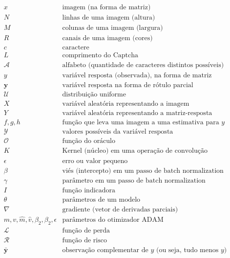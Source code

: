 \documentclass[12pt,twoside,brazilian]{book}
\begin{document}
\begin{displaymath}
\begin{array}{ll}
   x & \text{imagem (na forma de matriz)}\\
   N & \text{linhas de uma imagem (altura)}\\
   M & \text{colunas de uma imagem (largura)}\\
   R & \text{canais de uma imagem (cores)}\\
   c & \text{caractere}\\
   L & \text{comprimento do Captcha}\\
   \mathcal A & \text{alfabeto (quantidade de caracteres distintos possíveis)}\\
   y & \text{variável resposta (observada), na forma de matriz}\\
   \mathbf y & \text{variável resposta na forma de rótulo parcial}\\
   \mathcal U & \text{distribuição uniforme}\\
   X & \text{variável aleatória representando a imagem}\\
   Y & \text{variável aleatória representando a matriz-resposta}\\
   f, g, h & \text{função que leva uma imagem a uma estimativa para } y\\
   \mathcal Y & \text{valores possíveis da variável resposta}\\
   \mathcal O & \text{função do oráculo}\\
   K & \text{Kernel (núcleo) em uma operação de convolução}\\
   \epsilon & \text{erro ou valor pequeno}\\
   \beta & \text{viés (intercepto) em um passo de batch normalization}\\
   \gamma & \text{parâmetro em um passo de batch normalization}\\
   I & \text{função indicadora}\\
   \theta & \text{parâmetros de um modelo}\\
   \nabla & \text{gradiente (vetor de derivadas parciais)}\\
   m,v,\hat m, \hat v, \beta_2, \beta_2, \epsilon & \text{parâmetros do otimizador ADAM}\\
   \mathcal L & \text{função de perda}\\
   \mathcal R & \text{função de risco}\\
   \bar {\mathbf y} & \text{observação complementar de } y \text{ (ou seja, tudo menos } y \text{)}
\end{array}
\end{displaymath}
\end{document}
